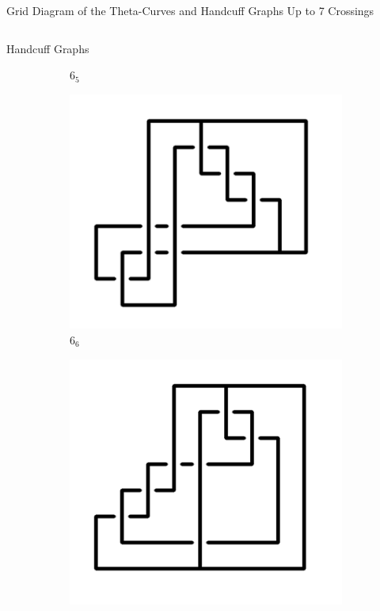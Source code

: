 \documentclass[final]{beamer}
\begin{document}
\begin{frame}[t]
\begin{alertblock}{Grid Diagram of the Theta-Curves and Handcuff Graphs Up to 7 Crossings}
\begin{columns}[t]
\begin{column}{0.5\textwidth}
\begin{alertblock}{Handcuff Graphs}
\begin{figure}
\begin{subfigure}{0.075\textwidth}
    \caption{$6_{5}$} 
    \end{subfigure}
    \begin{subfigure}{0.075\textwidth}
    \includegraphics[width=\columnwidth]{../Midterm_Poster/grid_diagram/handcuff_6_6.png}
    \caption{$6_{6}$} 
    \end{subfigure}
    \begin{subfigure}{0.075\textwidth}
    \includegraphics[width=\columnwidth]{../Midterm_Poster/grid_diagram/handcuff_6_7.png}

\end{subfigure}
\end{figure}
\end{alertblock}
\end{column}
\end{columns}
\end{alertblock}
\end{frame}
\end{document}
